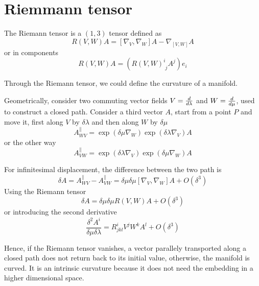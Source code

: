 \chapter{Riemmann tensor}

    \begin{definition}
        The Riemann tensor is a $(1,3)$ tensor defined as 
        \begin{equation*}
            R(V,W) A = [\nabla_V, \nabla_W] A - \nabla_{[V,W]} A
        \end{equation*}
        or in components 
        \begin{equation*}
            R(V, W) A = (R(V,W)^i_{\phantom i j} A^j) e_i
        \end{equation*}
    \end{definition}

    Through the Riemann tensor, we could define the curvature of a manifold.

    Geometrically, consider two commuting vector fields $V = \frac{d}{d\lambda}$ and $W = \frac{d}{d\mu}$, used to construct a closed path. Consider a third vector $A$, start from a point $P$ and move it, first along $V$ by $\delta \lambda$ and then along $W$ by $\delta \mu$
    \begin{equation*}
        A^\parallel_{WV} = \exp(\delta \mu \nabla_W) \exp(\delta \lambda \nabla_V) A
    \end{equation*}
    or the other way 
    \begin{equation*}
        A^\parallel_{VW} = \exp(\delta \lambda \nabla_V) \exp(\delta \mu \nabla_W)  A
    \end{equation*}

    For infinitesimal displacement, the difference between the two path is 
    \begin{equation*}
        \delta A = A^\parallel_{WV} - A^\parallel_{VW} = \delta \mu \delta \mu [\nabla_V, \nabla_W] A + O(\delta^3)
    \end{equation*}
    Using the Riemann tensor 
    \begin{equation*}
        \delta A = \delta \mu \delta \mu R(V,W) A + O(\delta^3)
    \end{equation*}
    or introducing the second derivative 
    \begin{equation*}
        \frac{\delta^2 A^i}{\delta \mu \delta \lambda} = R^i_{jkl} V^j W^k A^l + O(\delta^3)
    \end{equation*}

    Hence, if the Riemann tensor vanishes, a vector parallely transported along a closed path does not return back to its initial value, otherwise, the manifold is curved. It is an intrinsic curvature because it does not need the embedding in a higher dimensional space. 

